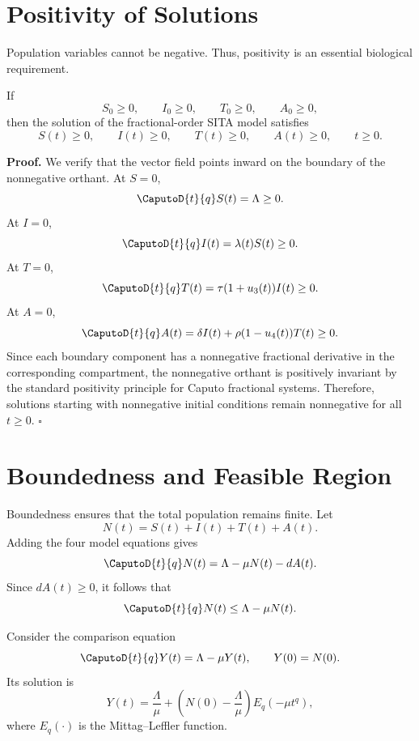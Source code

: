 \section{Positivity of Solutions}

Population variables cannot be negative. Thus, positivity is an essential biological requirement.

\begin{resultbox}[title={Theorem 4.2 --- Positivity}]
If
\[
S_0\geq0,\qquad I_0\geq0,\qquad T_0\geq0,\qquad A_0\geq0,
\]
then the solution of the fractional-order SITA model satisfies
\[
S(t)\geq0,\qquad I(t)\geq0,\qquad T(t)\geq0,\qquad A(t)\geq0,
\qquad t\geq0.
\]
\end{resultbox}

\noindent\textbf{Proof.}
We verify that the vector field points inward on the boundary of the nonnegative orthant. At $S=0$,
\[
\CaputoD{t}{q}S(t)=\Lambda\geq0.
\]
At $I=0$,
\[
\CaputoD{t}{q}I(t)=\lambda(t)S(t)\geq0.
\]
At $T=0$,
\[
\CaputoD{t}{q}T(t)=\tau(1+u_3(t))I(t)\geq0.
\]
At $A=0$,
\[
\CaputoD{t}{q}A(t)=\delta I(t)+\rho(1-u_4(t))T(t)\geq0.
\]
Since each boundary component has a nonnegative fractional derivative in the corresponding compartment, the nonnegative orthant is positively invariant by the standard positivity principle for Caputo fractional systems. Therefore, solutions starting with nonnegative initial conditions remain nonnegative for all $t\geq0$. \hfill$\square$

\section{Boundedness and Feasible Region}

Boundedness ensures that the total population remains finite. Let
\[
N(t)=S(t)+I(t)+T(t)+A(t).
\]
Adding the four model equations gives
\begin{equation}
\CaputoD{t}{q}N(t)=\Lambda-\mu N(t)-dA(t).
\label{eq:caputo_N}
\end{equation}
Since $dA(t)\geq0$, it follows that
\begin{equation}
\CaputoD{t}{q}N(t)\leq \Lambda-\mu N(t).
\label{eq:N_ineq}
\end{equation}

Consider the comparison equation
\[
\CaputoD{t}{q}Y(t)=\Lambda-\mu Y(t),\qquad Y(0)=N(0).
\]
Its solution is
\begin{equation}
Y(t)=\frac{\Lambda}{\mu}
+\left(N(0)-\frac{\Lambda}{\mu}\right)E_q(-\mu t^q),
\label{eq:Y_ML}
\end{equation}
where $E_q(\cdot)$ is the Mittag--Leffler function.

